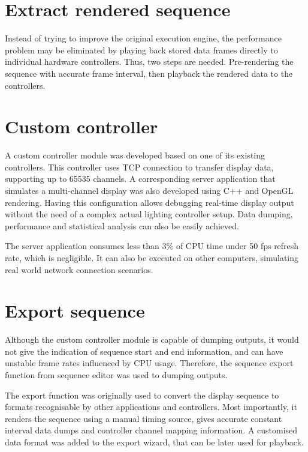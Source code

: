 

\section{Extract rendered sequence}

Instead of trying to improve the original execution engine, the performance problem may be eliminated by playing back stored data frames directly to individual hardware controllers. Thus, two steps are needed. Pre-rendering the sequence with accurate frame interval, then playback the rendered data to the controllers.

\section{Custom controller}

A custom controller module was developed based on one of its existing controllers. This controller uses TCP connection to transfer display data, supporting up to 65535 channels. A corresponding server application that simulates a multi-channel display was also developed using C++ and OpenGL \cite{shreiner2009opengl} rendering. Having this configuration allows debugging real-time display output without the need of a complex actual lighting controller setup. Data dumping, performance and statistical analysis can also be easily achieved. 

The server application consumes less than $3 \%$ of CPU time under 50 fps refresh rate, which is negligible. It can also be executed on other computers, simulating real world network connection scenarios.

\section{Export sequence}

Although the custom controller module is capable of dumping outputs, it would not give the indication of sequence start and end information, and can have unstable frame rates influenced by CPU usage. Therefore, the sequence export function from sequence editor was used to dumping outputs.

The export function was originally used to convert the display sequence to formats recognisable by other applications and controllers. Most importantly, it renders the sequence using a manual timing source, gives accurate constant interval data dumps and controller channel mapping information. A customised data format was added to the export wizard, that can be later used for playback. 




